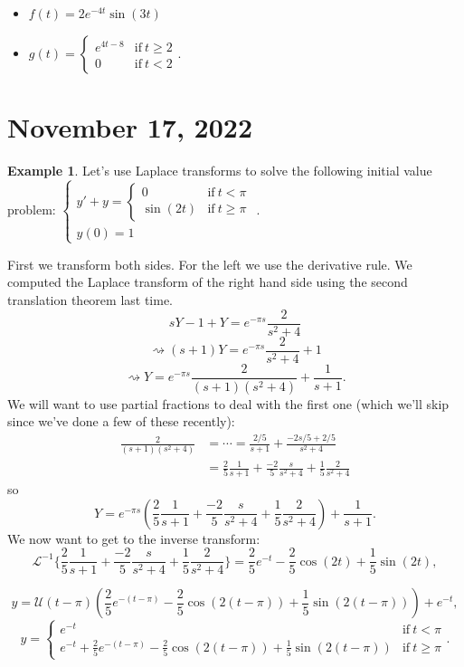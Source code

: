 \documentclass[12pt]{amsart}
\numberwithin{equation}{section}
\theoremstyle{plain} %
\newcommand{\Nov}[1]{\section{November #1, 2022}}
\newcommand{\rsa}{\rightsquigarrow}
\theoremstyle{definition}
\newtheorem{ex}[equation]{Example}
\theoremstyle{remark}
\newcommand{\LAi}[1]{\mathcal{L}^{-1}\{ #1 \}}
\newcommand{\U}{\mathcal{U}}
\begin{document}
\begin{enumerate}
\begin{framed}
\begin{itemize}
\item $\displaystyle f(t)=2 e^{-4t} \sin(3t)$
\item$\displaystyle g(t)= \begin{cases} e^{4t-8} &\text{if} \ t\geq 2 \\ 0 &\text{if} \ t<2\end{cases}$.
\end{itemize}
\end{framed}



\end{enumerate}

\Nov{17}
    
\begin{ex}  Let's use Laplace transforms to solve the following initial value problem:
 $\begin{cases} y' + y = \begin{cases}  0 &\text{if} \ t< \pi\\
\sin(2t) & \text{if} \ t\geq \pi \end{cases} \\ y(0)= 1\end{cases}$.

First we transform both sides. For the left we use the derivative rule. We computed the Laplace transform of the right hand side using the second translation theorem last time.
\[ sY -1 + Y = e^{-\pi s} \frac{2}{s^2+4}\]
\[\rsa (s+1) Y = e^{-\pi s} \frac{2}{s^2+4} + 1\]
\[ \rsa Y=  e^{-\pi s} \frac{2}{(s+1)(s^2+4)} + \frac{1}{s+1}.\]
We will want to use partial fractions to deal with the first one (which we'll skip since we've done a few of these recently):
\[ \begin{aligned}
\frac{2}{(s+1)(s^2+4)} &= \cdots = \frac{2/5}{s+1} + \frac{-2s/5 +2/5}{s^2+4} \\&=\frac{2}{5} \frac{1}{s+1} + \frac{-2}{5} \frac{s}{s^2+4} +\frac{1}{5} \frac{2}{s^2+4}\end{aligned}\]
so
\[ Y= e^{-\pi s} \left(\frac{2}{5} \frac{1}{s+1} + \frac{-2}{5} \frac{s}{s^2+4} +\frac{1}{5} \frac{2}{s^2+4}\right) + \frac{1}{s+1}.\]
We now want to get to the inverse transform:
\[ \LAi{\frac{2}{5} \frac{1}{s+1} + \frac{-2}{5} \frac{s}{s^2+4} +\frac{1}{5} \frac{2}{s^2+4}} = \frac{2}{5} e^{-t} - \frac{2}{5} \cos(2t) + \frac{1}{5} \sin(2t),\]

\[ y= \U(t-\pi) \left(\frac{2}{5} e^{-(t-\pi)} - \frac{2}{5} \cos(2(t-\pi)) + \frac{1}{5} \sin(2(t-\pi))\right) + e^{-t},\]
\[ y = \begin{cases} e^{-t} &\text{if} \ t< \pi \\
e^{-t} + \frac{2}{5} e^{-(t-\pi)} - \frac{2}{5} \cos(2(t-\pi)) + \frac{1}{5} \sin(2(t-\pi)) &\text{if} \ t\geq \pi\end{cases}.\]
\end{ex}
\end{document}
